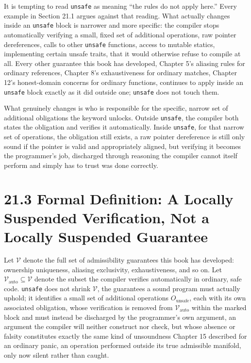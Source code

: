 \documentclass[11pt]{book}
\begin{document}
It is tempting to read \texttt{unsafe} as meaning ``the rules do not apply here.'' Every example in Section 21.1 argues against that reading. What actually changes inside an \texttt{unsafe} block is narrower and more specific: the compiler stops automatically verifying a small, fixed set of additional operations, raw pointer dereferences, calls to other \texttt{unsafe} functions, access to mutable statics, implementing certain unsafe traits, that it would otherwise refuse to compile at all. Every other guarantee this book has developed, Chapter 5's aliasing rules for ordinary references, Chapter 8's exhaustiveness for ordinary matches, Chapter 12's honest-domain concerns for ordinary functions, continues to apply inside an \texttt{unsafe} block exactly as it did outside one; \texttt{unsafe} does not touch them.

What genuinely changes is who is responsible for the specific, narrow set of additional obligations the keyword unlocks. Outside \texttt{unsafe}, the compiler both states the obligation and verifies it automatically. Inside \texttt{unsafe}, for that narrow set of operations, the obligation still exists, a raw pointer dereference is still only sound if the pointer is valid and appropriately aligned, but verifying it becomes the programmer's job, discharged through reasoning the compiler cannot itself perform and simply has to trust was done correctly.

\section*{21.3 Formal Definition: A Locally Suspended Verification, Not a Locally Suspended Guarantee}

Let $\mathcal{V}$ denote the full set of admissibility guarantees this book has developed: ownership uniqueness, aliasing exclusivity, exhaustiveness, and so on. Let $\mathcal{V}_{\text{auto}} \subseteq \mathcal{V}$ denote the subset the compiler verifies automatically in ordinary, safe code. \texttt{unsafe} does not shrink $\mathcal{V}$, the guarantees a sound program must actually uphold; it identifies a small set of additional operations $O_{\text{unsafe}}$, each with its own associated obligation, whose verification is removed from $\mathcal{V}_{\text{auto}}$ within the marked block and must instead be discharged by the programmer's own argument, an argument the compiler will neither construct nor check, but whose absence or falsity constitutes exactly the same kind of unsoundness Chapter 15 described for an ordinary panic, an operation performed outside its true admissible manifold, only now silent rather than caught.
\end{document}
